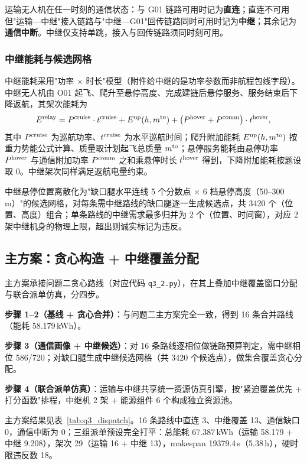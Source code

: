 运输无人机在任一时刻的通信状态：与 G01 链路可用时记为\textbf{直连}；直连不可用但"运输—中继"接入链路与"中继—G01"回传链路同时可用时记为\textbf{中继}；其余记为\textbf{通信中断}。中继仅支持单跳，接入与回传链路须同时刻可用。

\subsubsection{中继能耗与候选网格}

中继能耗采用"功率 $\times$ 时长"模型（附件给中继的是功率参数而非航程包线字段）。中继无人机由 O01 起飞、爬升至悬停高度、完成建链后悬停服务、服务结束后下降返航，其架次能耗为
\begin{equation}
E^{\rm relay} = P^{\rm cruise}\cdot t^{\rm cruise} + E^{\rm up}(h,m^{\rm to}) + \bigl(P^{\rm hover}+P^{\rm comm}\bigr)\cdot t^{\rm hover},
\end{equation}
其中 $P^{\rm cruise}$ 为巡航功率、$t^{\rm cruise}$ 为水平巡航时间；爬升附加能耗 $E^{\rm up}(h,m^{\rm to})$ 按重力势能公式计算、质量取计划起飞总质量 $m^{\rm to}$；悬停服务能耗由悬停功率 $P^{\rm hover}$ 与通信附加功率 $P^{\rm comm}$ 之和乘悬停时长 $t^{\rm hover}$ 得到，下降附加能耗按题设取 0。中继架次同样满足返航电量约束。

中继悬停位置离散化为"缺口腿水平连线 5 个分数点 $\times$ 6 档悬停高度（50--300\,m）"的候选网格，对每条需中继路线的缺口腿逐一生成候选点，共 3420 个（位置、高度）组合；单条路线的中继需求最多归并为 2 个（位置、时间窗），对应 2 架中继机身的物理上限，超出则诚实标记为违反。

\subsection{主方案：贪心构造 + 中继覆盖分配}

主方案承接问题二贪心路线（对应代码 \texttt{q3\_2.py}），在其上叠加中继覆盖窗口分配与联合派单仿真，分四步。

\textbf{步骤 1--2（基线 + 贪心合并）}：与问题二主方案完全一致，得到 16 条合并路线（能耗 58.179\,kWh）。

\textbf{步骤 3（通信画像 + 中继候选）}：对 16 条路线逐相位做链路预算判定，需中继相位 586/720；对缺口腿生成中继候选网格（共 3420 个候选点），做集合覆盖贪心分配。

\textbf{步骤 4（联合派单仿真）}：运输与中继共享统一资源仿真引擎，按"紧迫覆盖优先 + 打分函数"排程，中继机 2 架 + 能源组件 6 个构成独立资源池。

主方案结果见表~\ref{tab:q3_dispatch}。16 条路线中直连 3、中继覆盖 13、通信缺口 0，通信中断为 0；三组派单预设完全打平：总能耗 67.387\,kWh（运输 58.179 + 中继 9.208），架次 29（运输 16 + 中继 13），makespan 19379.4\,s（5.38\,h），硬时限违反数 18。

